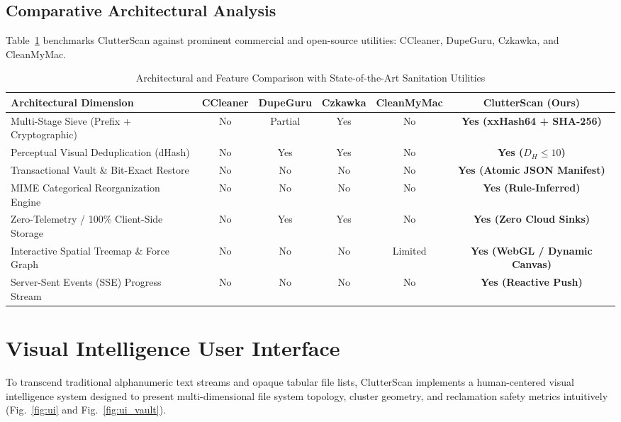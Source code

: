 \documentclass[journal,compsoc,10pt,twocolumn]{IEEEtran}
\begin{document}
\subsection{Comparative Architectural Analysis}
Table~\ref{tab:comparison} benchmarks ClutterScan against prominent commercial and open-source utilities: CCleaner, DupeGuru, Czkawka, and CleanMyMac.

\begin{table}[t]
\caption{Architectural and Feature Comparison with State-of-the-Art Sanitation Utilities}
\label{tab:comparison}
\centering
\small
\begin{tabularx}{\textwidth}{lccccc}
\toprule
\textbf{Architectural Dimension} & \textbf{CCleaner} & \textbf{DupeGuru} & \textbf{Czkawka} & \textbf{CleanMyMac} & \textbf{ClutterScan (Ours)} \\
\midrule
Multi-Stage Sieve (Prefix + Cryptographic) & No & Partial & Yes & No & \textbf{Yes (xxHash64 + SHA-256)} \\
Perceptual Visual Deduplication (dHash)    & No & Yes & Yes & No & \textbf{Yes ($D_H \le 10$)} \\
Transactional Vault \& Bit-Exact Restore   & No & No & No & No & \textbf{Yes (Atomic JSON Manifest)} \\
MIME Categorical Reorganization Engine    & No & No & No & No & \textbf{Yes (Rule-Inferred)} \\
Zero-Telemetry / 100\% Client-Side Storage & No & Yes & Yes & No & \textbf{Yes (Zero Cloud Sinks)} \\
Interactive Spatial Treemap \& Force Graph & No & No & No & Limited & \textbf{Yes (WebGL / Dynamic Canvas)} \\
Server-Sent Events (SSE) Progress Stream   & No & No & No & No & \textbf{Yes (Reactive Push)} \\
\bottomrule
\end{tabularx}
\end{table}

\section{Visual Intelligence User Interface}
\label{sec:ui}
To transcend traditional alphanumeric text streams and opaque tabular file lists, ClutterScan implements a human-centered visual intelligence system designed to present multi-dimensional file system topology, cluster geometry, and reclamation safety metrics intuitively (Fig.~\ref{fig:ui} and Fig.~\ref{fig:ui_vault}).
\end{document}
